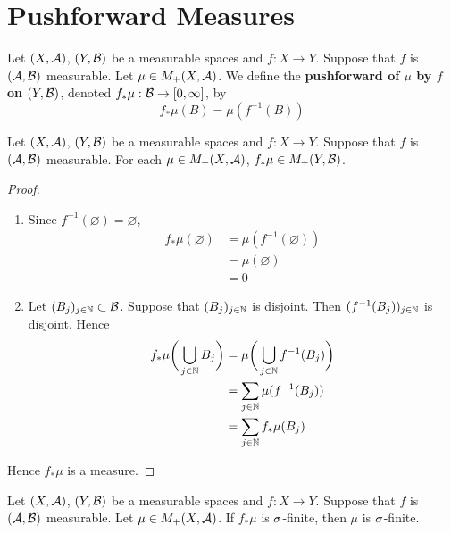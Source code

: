 \documentclass{book}
\begin{document}
\newpage
\section{Pushforward Measures}

\begin{defn} 
	Let $(X, \mathcal{A})$, $(Y, \mathcal{B})$ be a measurable spaces and $f: X \rightarrow Y$. Suppose that $f$ is $(\mathcal{A}, \mathcal{B})$ measurable. Let $\mu \in M_+(X, \mathcal{A})$. We define the \textbf{pushforward of $\mu$ by $f$ on $(Y, \mathcal{B})$}, denoted $f_*\mu: \mathcal{B} \rightarrow [0, \infty]$, by 
	$$f_*\mu(B) = \mu(f^{-1}(B))$$
\end{defn}

\begin{ex} 
	Let $(X, \mathcal{A})$, $(Y, \mathcal{B})$ be a measurable spaces and $f: X \rightarrow Y$. Suppose that $f$ is $(\mathcal{A}, \mathcal{B})$ measurable. For each $\mu \in M_+(X, \mathcal{A})$, $f_*\mu \in M_+(Y, \mathcal{B})$.
\end{ex}

\begin{proof}\
	\begin{enumerate}
		\item Since $f^{-1}(\varnothing) = \varnothing$, 
		\begin{align*}
			f_*\mu(\varnothing) 
			& = \mu(f^{-1}(\varnothing)) \\
			& = \mu(\varnothing) \\
			& = 0
		\end{align*}
		\item Let $(B_j)_{j \in \mathbb{N}} \subset \mathcal{B}$. Suppose that $(B_j)_{j \in \mathbb{N}}$ is disjoint. Then $(f^{-1}(B_j))_{j \in \mathbb{N}}$ is disjoint. Hence 
		\begin{align*}
			f_*\mu \bigg( \bigcup_{j \in \mathbb{N}} B_j \bigg)
			& = \mu \bigg( \bigcup_{j \in \mathbb{N}} f^{-1}(B_j) \bigg) \\
			& = \sum_{j \in \mathbb{N}} \mu(f^{-1}(B_j)) \\
			& = \sum_{j \in \mathbb{N}} f_*\mu(B_j)
		\end{align*}
	\end{enumerate}
	Hence $f_* \mu$ is a measure.
\end{proof}

\begin{ex} 
	Let $(X, \mathcal{A})$, $(Y, \mathcal{B})$ be a measurable spaces and $f: X \rightarrow Y$. Suppose that $f$ is $(\mathcal{A}, \mathcal{B})$ measurable. Let $\mu \in M_+(X, \mathcal{A})$. If $f_*\mu$ is $\sigma$-finite, then $\mu$ is $\sigma$-finite.
\end{ex}
\end{document}
